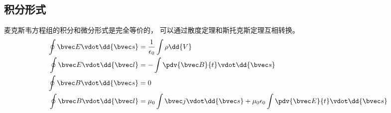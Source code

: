 \subsection{积分形式}
麦克斯韦方程组的积分和微分形式是完全等价的， 可以通过散度定理和斯托克斯定理互相转换。
\begin{align}
\oint \bvec E \vdot \dd{\bvec s} &= \frac{1}{\epsilon_0}\int \rho \dd{V}\\
\oint \bvec E \vdot \dd{\bvec l} &= -\int \pdv{\bvec B}{t} \vdot \dd{\bvec s}\\
\oint \bvec B \vdot \dd{\bvec s} &= 0\\
\oint \bvec B \vdot \dd{\bvec l} &= \mu_0 \int \bvec j \vdot \dd{\bvec s} + \mu_0 \epsilon_0 \int \pdv{\bvec E}{t} \vdot \dd{\bvec s}
\end{align}
